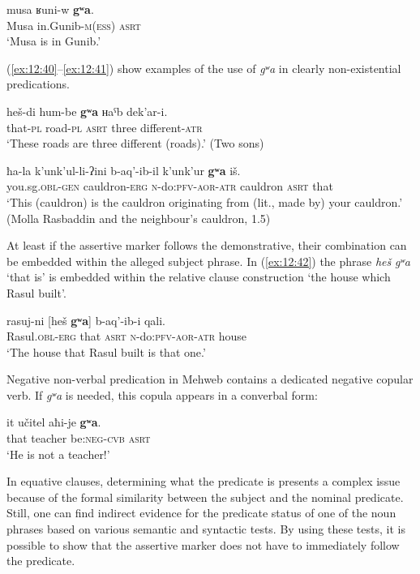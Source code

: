 ﻿\documentclass[output=paper]{langsci/langscibook}
\begin{document}
\ex \label{ex:12:39} %
\gll musa ʁuni-w \textbf{gʷa}.\\
Musa in.Gunib-\textsc{m}(\textsc{ess}) \textsc{asrt}\\
\glt `Musa is in Gunib.'
\z

  (\ref{ex:12:40}–\ref{ex:12:41}) show examples of the use of \emph{gʷa} in clearly
non-existential predications.

\ea \label{ex:12:40} %
\gll heš-di hum-be \textbf{gʷa} ʜaˤb dek'ar-i.\\
that-\textsc{pl} road-\textsc{pl} \textsc{asrt} three different-\textsc{atr}\\
\glt `These roads are three different (roads).' (Two sons)

\ex \label{ex:12:41} %
\gll ħa-la k'unk'ul-li-ʔini b-aq'-ib-il k'unk'ur \textbf{gʷa} iš.\\
you.sg.\textsc{obl}-\textsc{gen} cauldron-\textsc{erg} \textsc{n}-do:\textsc{pfv}-\textsc{aor}-\textsc{atr} cauldron \textsc{asrt} that\\
\glt `This (cauldron) is the cauldron originating from (lit., made by) your
cauldron.' (Molla Rasbaddin and the neighbour's cauldron, 1.5)
\z

At least if the assertive marker follows the demonstrative, their
combination can be embedded within the alleged subject phrase. In (\ref{ex:12:42})
the phrase \emph{heš} \emph{gʷa} `that is' is embedded within the
relative clause construction `the house which Rasul built'.

\ea \label{ex:12:42} %
\gll rasuj-ni [heš \textbf{gʷa}] b-aq'-ib-i qali.\\
Rasul.\textsc{obl}-\textsc{erg} that \textsc{asrt} \textsc{n}-do:\textsc{pfv}-\textsc{aor}-\textsc{atr} house\\
\glt `The house that Rasul built is that one.'
\z

Negative non-verbal predication in Mehweb contains a dedicated negative
copular verb. If \emph{gʷa} is needed, this copula appears in a converbal
form:

\ea \label{ex:12:43} %
\gll it učitel aħi-je \textbf{gʷa}.\\
that teacher {be}:\textsc{neg}-\textsc{cvb} \textsc{asrt}\\
\glt `He is not a teacher!'
\z

In equative clauses, determining what  the predicate is presents a
complex issue because of the formal similarity between the subject and
the nominal predicate. Still, one can find indirect evidence for the
predicate status of one of the noun phrases based on various semantic
and syntactic tests. By using these tests, it is possible to show that
the assertive marker does not have to immediately follow the 
predicate.
\end{document}
